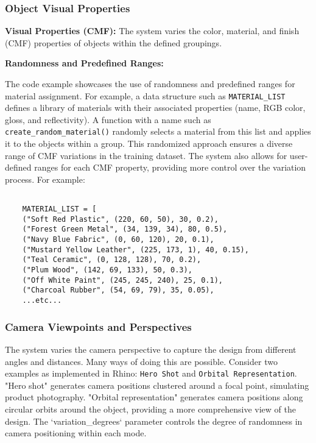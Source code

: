\documentclass{article}
\begin{document}
\subsubsection{Object Visual Properties}

\textbf{Visual Properties (CMF):} The system varies the color, material, and finish (CMF) properties of objects within the defined groupings.

\textbf{Randomness and Predefined Ranges:}

The code example showcases the use of randomness and predefined ranges for material assignment. For example, a data structure such as \texttt{MATERIAL\_LIST} defines a library of materials with their associated properties (name, RGB color, gloss, and reflectivity). A function with a name such as \texttt{create\_random\_material()} randomly selects a material from this list and applies it to the objects within a group. This randomized approach ensures a diverse range of CMF variations in the training dataset. The system also allows for user-defined ranges for each CMF property, providing more control over the variation process. For example:

        \begin{verbatim}
        
    MATERIAL_LIST = [
    ("Soft Red Plastic", (220, 60, 50), 30, 0.2),
    ("Forest Green Metal", (34, 139, 34), 80, 0.5),
    ("Navy Blue Fabric", (0, 60, 120), 20, 0.1),
    ("Mustard Yellow Leather", (225, 173, 1), 40, 0.15),
    ("Teal Ceramic", (0, 128, 128), 70, 0.2),
    ("Plum Wood", (142, 69, 133), 50, 0.3),
    ("Off White Paint", (245, 245, 240), 25, 0.1),
    ("Charcoal Rubber", (54, 69, 79), 35, 0.05),
    ...etc...
        \end{verbatim}

\subsubsection{Camera Viewpoints and Perspectives}

The system varies the camera perspective to capture the design from different angles and distances. Many ways of doing this are possible. Consider two examples as implemented in Rhino: \texttt{Hero Shot} and \texttt{Orbital Representation}. "Hero shot" generates camera positions clustered around a focal point, simulating product photography. "Orbital representation" generates camera positions along circular orbits around the object, providing a more comprehensive view of the design. The `variation\_degrees` parameter controls the degree of randomness in camera positioning within each mode.
\end{document}
